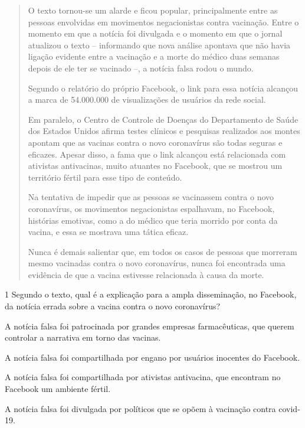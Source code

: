 \begin{quote}
O texto tornou-se um alarde e ficou popular, principalmente entre as pessoas
envolvidas em movimentos negacionistas contra vacinação. Entre o momento em
que a notícia foi divulgada e o momento em que o jornal atualizou o texto –
informando que nova análise apontava que não havia ligação evidente entre a
vacinação e a morte do médico duas semanas depois de ele ter se vacinado –,
a notícia falsa rodou o mundo.

Segundo o relatório do próprio Facebook, o link para essa notícia alcançou
a marca de 54.000.000 de visualizações de usuários da rede social.

Em paralelo, o Centro de Controle de Doenças do Departamento de Saúde dos Estados
Unidos afirma testes clínicos e pesquisas realizados aos montes apontam que as
vacinas contra o novo coronavírus são todas seguras e eficazes. Apesar disso, a
fama que o link alcançou está relacionada com ativistas antivacinas, muito atuantes
no Facebook, que se mostrou um território fértil para esse tipo de conteúdo.

Na tentativa de impedir que as pessoas se vacinassem contra o novo coronavírus,
os movimentos negacionistas espalhavam, no Facebook, histórias emotivas, como
a do médico que teria morrido por conta da vacina, e essa se mostrava uma
tática eficaz.

Nunca é demais salientar que, em todos os casos de pessoas que morreram
mesmo vacinadas contra o novo coronavírus, nunca foi encontrada uma evidência
de que a vacina estivesse relacionada à causa da morte.

\end{quote}

\pagebreak
\num{1} Segundo o texto, qual é a explicação para a ampla
disseminação, no Facebook, da notícia errada sobre a vacina contra o novo coronavírus?

\begin{escolha}
\item A notícia falsa foi patrocinada por grandes empresas farmacêuticas,
que querem controlar a narrativa em torno das vacinas.

\item A notícia falsa foi compartilhada por engano por usuários inocentes
do Facebook.

\item A notícia falsa foi compartilhada por ativistas antivacina, que
encontram no Facebook um ambiente fértil.

\item A notícia falsa foi divulgada por políticos que se opõem à vacinação contra covid-19.
\end{escolha}

